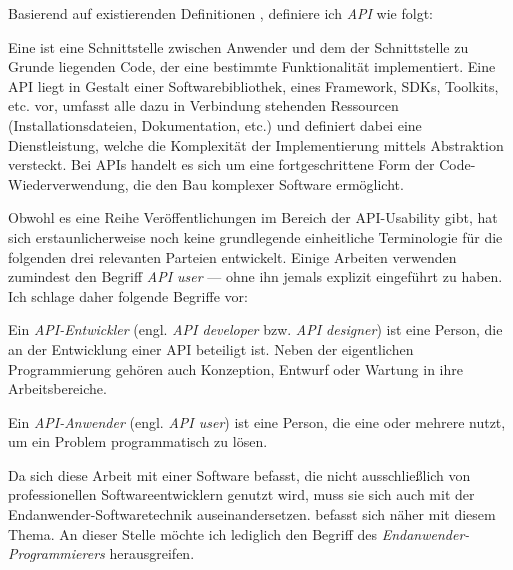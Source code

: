 \bigskip

Basierend auf existierenden Definitionen \citep{dekel2011increasing,Tenny:2011jp,zibran2008makes,Zibran:2011fx,McLellan:1998cu,Henning:2007kg,Robillard:2009cs,Stylos:2009ts}, definiere ich \textit{API} wie folgt:
\begin{description}
  \item Eine  ist eine Schnittstelle zwischen Anwender und dem der Schnittstelle zu Grunde liegenden Code, der eine bestimmte Funktionalität implementiert. Eine API liegt in Gestalt einer Softwarebibliothek, eines Framework, SDKs, Toolkits, etc. vor, umfasst alle dazu in Verbindung stehenden Ressourcen (Installationsdateien, Dokumentation, etc.) und definiert dabei eine Dienstleistung, welche die Komplexität der Implementierung mittels Abstraktion versteckt. Bei APIs handelt es sich um eine fortgeschrittene Form der Code-Wiederverwendung, die den Bau komplexer Software ermöglicht.
\end{description}

\bigskip

Obwohl es eine Reihe Veröffentlichungen im Bereich der API-Usability gibt, hat sich erstaunlicherweise noch keine grundlegende einheitliche Terminologie für die folgenden drei relevanten Parteien entwickelt. Einige Arbeiten verwenden zumindest den Begriff \textit{API user} --- ohne ihn jemals explizit eingeführt zu haben. Ich schlage daher folgende Begriffe vor:

\begin{description}
  \item Ein \textit{API-Entwickler} (engl. \textit{API developer} bzw. \textit{API designer}) ist eine Person, die an der Entwicklung einer API beteiligt ist. Neben der eigentlichen Programmierung gehören auch Konzeption, Entwurf oder Wartung in ihre Arbeitsbereiche.
  \item Ein \textit{API-Anwender} (engl. \textit{API user}) ist eine Person, die eine oder mehrere  nutzt, um ein Problem programmatisch zu lösen.
\end{description}

\bigskip

Da sich diese Arbeit mit einer Software befasst, die nicht ausschließlich von professionellen Softwareentwicklern genutzt wird, muss sie sich auch mit der Endanwender-Softwaretechnik auseinandersetzen.  befasst sich näher mit diesem Thema. An dieser Stelle möchte ich lediglich den Begriff des \textit{Endanwender-Programmierers} herausgreifen.

